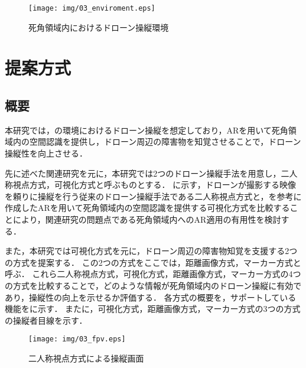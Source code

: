 \documentclass[submit, sigrecommended]{ipsj}
\begin{document}

\begin{figure}[b]
  \centering
  \texttt{[image: img/03\_enviroment.eps]}
  \caption{死角領域内におけるドローン操縦環境}
  \label{fig:03_enviroment}
  \end{figure}
  

\section{提案方式}
\subsection{概要}
本研究では，の環境におけるドローン操縦を想定しており，ARを用いて死角領域内の空間認識を提供し，ドローン周辺の障害物を知覚させることで，ドローン操縦性を向上させる．
\par
先に述べた関連研究\cite{article-ar05}を元に，本研究では2つのドローン操縦手法を用意し，二人称視点方式，可視化方式と呼ぶものとする．
に示す，ドローンが撮影する映像を頼りに操縦を行う従来のドローン操縦手法である二人称視点方式と，を参考に作成したARを用いて死角領域内の空間認識を提供する可視化方式を比較することにより，関連研究の問題点である死角領域内へのAR適用の有用性を検討する．

また，本研究では可視化方式を元に，ドローン周辺の障害物知覚を支援する2つの方式を提案する．
この2つの方式をここでは，距離画像方式，マーカー方式と呼ぶ．
これら二人称視点方式，可視化方式，距離画像方式，マーカー方式の4つの方式を比較することで，どのような情報が死角領域内のドローン操縦に有効であり，操縦性の向上を示せるか評価する．
各方式の概要を，サポートしている機能をに示す．
またに，可視化方式，距離画像方式，マーカー方式の3つの方式の操縦者目線を示す．


\begin{figure}[b]
  \centering
  \texttt{[image: img/03\_fpv.eps]}
  \caption{二人称視点方式による操縦画面}
  \label{fig:03_FPV}
\end{figure}
\end{document}
